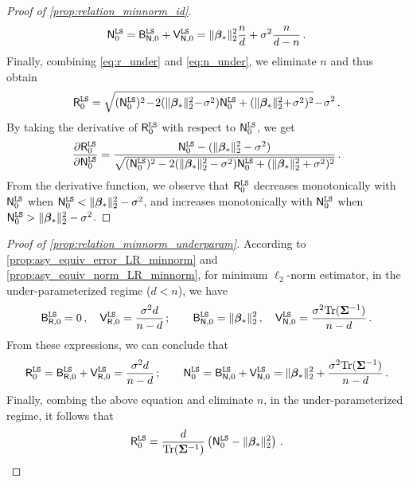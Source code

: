 \begin{proof}[Proof of \cref{prop:relation_minnorm_id}]
\begin{align}\label{eq:n_under}
\mathsf N_{0}^{\tt LS} = \mathsf B_{\mathsf N,0}^{\tt LS} + \mathsf V_{\mathsf N,0}^{\tt LS} = \|{\boldsymbol \beta}_*\|_2^2\frac{n}{d} + \sigma^2\frac{n}{d-n}\,.
\end{align}
Finally, combining \cref{eq:r_under} and \cref{eq:n_under}, we eliminate $n$ and thus obtain
\[
\begin{aligned}
    \sR_{0}^{\tt LS} = \sqrt{(\sN^{\tt LS}_0)^2 \!-\! 2(\|\bbeta_*\|_2^2 \!-\! \sigma^2)\sN^{\tt LS}_0 + (\|\bbeta_*\|_2^2 \!+\! \sigma^2)^2} \!-\!\sigma^2\,.
\end{aligned}
\]
By taking the derivative of $\mathsf R_{0}^{\tt LS}$ with respect to $\mathsf N_{0}^{\tt LS}$, we get
\[
\frac{\partial \mathsf R_{0}^{\tt LS}}{\partial \mathsf N_{0}^{\tt LS}} = \frac{\mathsf N_{0}^{\tt LS} - (\|{\boldsymbol \beta}_*\|_2^2 - \sigma^2)}{\sqrt{(\mathsf N_{0}^{\tt LS})^2 - 2(\|{\boldsymbol \beta}_*\|_2^2 - \sigma^2)\mathsf N_{0}^{\tt LS} + (\|{\boldsymbol \beta}_*\|_2^2 + \sigma^2)^2}}\,.
\]
From the derivative function, we observe that $\mathsf R_{0}^{\tt LS}$ decreases monotonically with $\mathsf N_{0}^{\tt LS}$ when $\mathsf N_{0}^{\tt LS} < \|\boldsymbol{\beta}_*\|_2^2 - \sigma^2$, and increases monotonically with $\mathsf N_{0}^{\tt LS}$ when $\mathsf N_{0}^{\tt LS} > \|\boldsymbol{\beta}_*\|_2^2 - \sigma^2$.
\end{proof}

\begin{proof}[Proof of \cref{prop:relation_minnorm_underparam}]
According to \cref{prop:asy_equiv_error_LR_minnorm} and \cref{prop:asy_equiv_norm_LR_minnorm}, for minimum $\ell_2$-norm estimator, in the under-parameterized regime ($d<n$), we have
\[
\begin{aligned}
\mathsf B_{\mathsf R,0}^{\tt LS} = 0\,, \quad \mathsf V_{\mathsf R,0}^{\tt LS} = \frac{\sigma^2d}{n-d}\,; \quad \quad \mathsf B_{\mathsf N,0}^{\tt LS} = \|{\boldsymbol \beta}_*\|_2^2\,, \quad \mathsf V_{\mathsf N,0}^{\tt LS} = \frac{\sigma^2{\rm Tr}({\boldsymbol \Sigma}^{-1})}{n-d}\,. 
\end{aligned}
\]
From these expressions, we can conclude that
\[
\begin{aligned}
    \mathsf R_{0}^{\tt LS} = \mathsf B_{\mathsf R,0}^{\tt LS} + \mathsf V_{\mathsf R,0}^{\tt LS} = \frac{\sigma^2d}{n-d}\,; \quad \quad \mathsf N_{0}^{\tt LS} = \mathsf B_{\mathsf N,0}^{\tt LS} + \mathsf V_{\mathsf N,0}^{\tt LS} = \|{\boldsymbol \beta}_*\|_2^2 + \frac{\sigma^2{\rm Tr}({\boldsymbol \Sigma}^{-1})}{n-d}\,. 
\end{aligned}
\]
Finally, combing the above equation and eliminate \(n\), in the under-parameterized regime, it follows that
\begin{equation}\label{eq:rn_under}
 \mathsf R_{0}^{\tt LS} = \frac{d}{{\rm Tr}({\boldsymbol \Sigma}^{-1})}\left(\mathsf N_{0}^{\tt LS} - \|{\boldsymbol \beta}_*\|_2^2\right)\,.   
\end{equation}
\end{proof}


